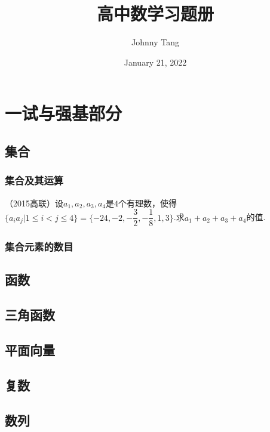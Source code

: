 \documentclass[lang=cn, zihao=4.5]{elegantbook}
\title{高中数学习题册}
\subtitle
\author{Johnny Tang}
\institute{DEEP Team}
\date{January 21, 2022}
\begin{document}
\maketitle

\frontmatter

\mainmatter

\tableofcontents

\newpage

\part{一试与强基部分}

\chapter{集合}

\section{集合及其运算}

\begin{example} %
	（2015高联）设$a_1,a_2,a_3,a_4$是$4$个有理数，使得$\{ a_ia_j | 1 \leq i < j \leq 4 \} = \{ -24,-2,-\dfrac{3}{2},-\dfrac{1}{8},1,3 \}$.求$a_1+a_2+a_3+a_4$的值.
\end{example}

\section{集合元素的数目}

\chapter{函数}

\chapter{三角函数}

\chapter{平面向量}

\chapter{复数}

\chapter{数列}
\end{document}
